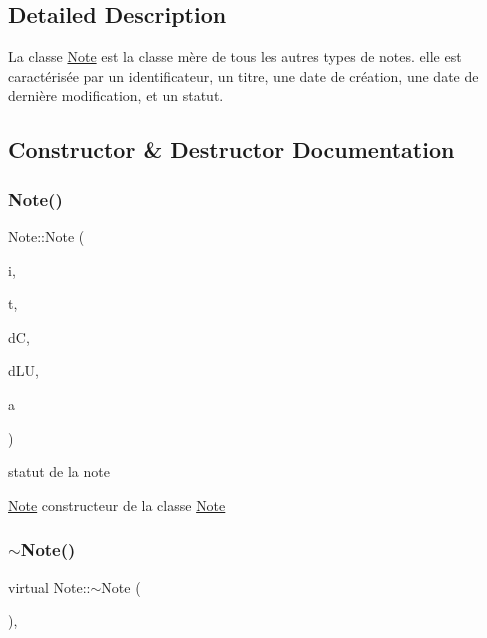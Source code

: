\subsection{Detailed Description}
La classe \hyperlink{classNote}{Note} est la classe mère de tous les autres types de notes. elle est caractérisée par un identificateur, un titre, une date de création, une date de dernière modification, et un statut. 

\subsection{Constructor \& Destructor Documentation}
\mbox{\label{classNote_a02fb01f74090a4f302882782445ca9ef}} 
\subsubsection{\texorpdfstring{Note()}{Note()}}
{\footnotesize\ttfamily Note\+::\+Note (\begin{DoxyParamCaption}\item[{const Q\+String \&}]{i,  }\item[{const Q\+String \&}]{t,  }\item[{tm $\ast$}]{dC,  }\item[{tm $\ast$}]{d\+LU,  }\item[{Note\+Status}]{a }\end{DoxyParamCaption})\hspace{0.3cm}{\ttfamily [inline]}}



statut de la note 

\hyperlink{classNote}{Note} constructeur de la classe \hyperlink{classNote}{Note} \mbox{\label{classNote_a673b00445b14ee36a2471662b83f7c1c}} 
\subsubsection{\texorpdfstring{$\sim$\+Note()}{~Note()}}
{\footnotesize\ttfamily virtual Note\+::$\sim$\+Note (\begin{DoxyParamCaption}{ }\end{DoxyParamCaption})\hspace{0.3cm}{\ttfamily [inline]}, {\ttfamily [virtual]}}



